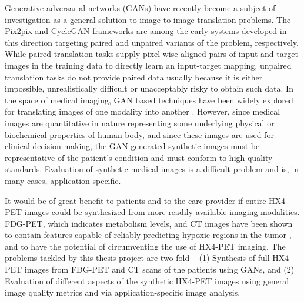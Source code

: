 Generative adversarial networks (GANs) have recently become a subject of investigation as a general solution to image-to-image translation problems. The Pix2pix and CycleGAN frameworks \cite{isola2017image, zhu2017unpaired} are among the early systems developed in this direction targeting paired and unpaired variants of the problem, respectively. While paired translation tasks supply pixel-wise aligned pairs of input and target images in the training data to directly learn an input-target mapping, unpaired translation tasks do not provide paired data usually because it is either impossible, unrealistically difficult or unacceptably risky to obtain such data. In the space of medical imaging, GAN based techniques have been widely explored for translating images of one modality into another \cite{yi2019generative}. However, since medical images are quantitative in nature representing some underlying physical or biochemical properties of human body, and since these images are used for clinical decision making, the GAN-generated synthetic images must be representative of the patient's condition and must conform to high quality standards. Evaluation of synthetic medical images is a difficult problem and is, in many cases, application-specific. 

It would be of great benefit to patients and to the care provider if entire HX4-PET images could be synthesized from more readily available imaging modalities. FDG-PET, which indicates metabolism levels, and CT images have been shown to contain features capable of reliably predicting hypoxic regions in the tumor \cite{even2017predicting, sanduleanu2020non}, and to have the potential of circumventing the use of HX4-PET imaging. The problems tackled by this thesis project are two-fold -- (1) Synthesis of full HX4-PET images from FDG-PET and CT scans of the patients using GANs, and (2) Evaluation of different aspects of the synthetic HX4-PET images using general image quality metrics and via application-specific image analysis.



